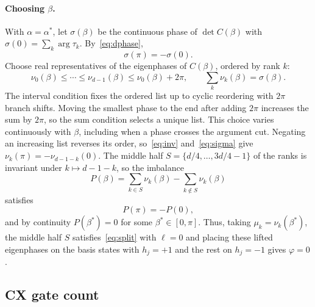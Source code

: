\documentclass[11pt]{article}
\begin{document}
\paragraph{Choosing $\beta$.} With $\alpha=\alpha^\ast$, let $\sigma(\beta)$ be the continuous phase
of $\det C(\beta)$ with $\sigma(0)=\sum_k\arg\tau_k$. By~\eqref{eq:dphase},
\begin{equation}\label{eq:sigma}
\sigma(\pi)=-\sigma(0).
\end{equation}
Choose real representatives of the eigenphases of $C(\beta)$, ordered by rank $k$:
\begin{equation}\label{eq:nu}
\nu_0(\beta)\le\cdots\le\nu_{d-1}(\beta)\le\nu_0(\beta)+2\pi,\qquad
\sum_k\nu_k(\beta)=\sigma(\beta).
\end{equation}
The interval condition fixes the ordered list up to cyclic reordering with $2\pi$ branch
shifts. Moving the smallest phase to the end after adding $2\pi$ increases the sum by $2\pi$,
so the sum condition selects a unique list. This choice varies continuously with $\beta$,
including when a phase crosses the argument cut. Negating an increasing list reverses its
order, so~\eqref{eq:inv} and~\eqref{eq:sigma} give $\nu_k(\pi)=-\nu_{d-1-k}(0)$. The middle
half $S=\{d/4,\dots,3d/4-1\}$ of the ranks is invariant under $k\mapsto d-1-k$, so the imbalance
\begin{equation}\label{eq:P}
P(\beta)=\sum_{k\in S}\nu_k(\beta)-\sum_{k\notin S}\nu_k(\beta)
\end{equation}
satisfies
\begin{equation}\label{eq:sign}
P(\pi)=-P(0),
\end{equation}
and by continuity $P(\beta^\ast)=0$ for some $\beta^\ast\in[0,\pi]$.
Thus, taking $\mu_k=\nu_k(\beta^\ast)$, the middle half $S$ satisfies~\eqref{eq:split} with $\ell=0$ and placing
these lifted eigenphases on the basis states with $h_j=+1$ and the rest on $h_j=-1$ gives $\varphi=0$.

\subsection{CX gate count}\label{sec:count}
\end{document}

